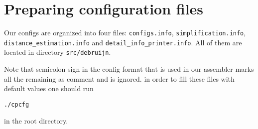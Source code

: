 \documentclass{article}
\begin{document}
\section{Preparing configuration files}
Our configs are organized into four files: {\tt configs.info}, {\tt simplification.info}, {\tt distance\_estimation.info} and {\tt detail\_info\_printer.info}. 
All of them are located in directory {\tt src/debruijn}.

Note that semicolon sign in the config format that is used in our assembler marks all the remaining as comment and is ignored.
in order to fill these files with default values one should run
\begin{lstlisting}
./cpcfg
\end{lstlisting}
in the root directory.
\end{document}
